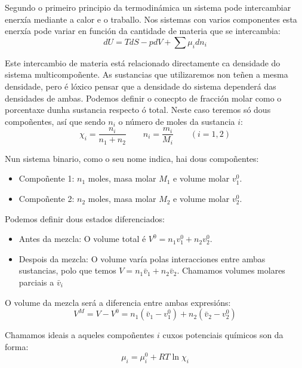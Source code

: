 \documentclass[12pt, a4paper, titlepage]{article}
\begin{document}
  Segundo o primeiro principio da termodinámica un sistema pode intercambiar enerxía mediante a calor e o traballo. Nos sistemas con varios componentes esta enerxía pode variar en función da cantidade de materia que se intercambia:
  \begin{equation}
    dU = TdS - pdV + \sum \mu_i dn_i
    \label{ec:primeiro_principio}
  \end{equation}

  Este intercambio de materia está relacionado directamente ca densidade do sistema multicompoñente. As sustancias que utilizaremos non teñen a mesma densidade, pero é lóxico pensar que a densidade do sistema dependerá das densidades de ambas. Podemos definir o conecpto de fracción molar como o porcentaxe dunha sustancia respecto ó total. Neste caso teremos só dous compoñentes, así que sendo $n_i$ o número de moles da sustancia $i$:
  \begin{equation}
    \chi_i = \frac{n_i}{n_1 + n_2} \qquad n_i = \frac{m_i}{M_i} \qquad (i = 1, 2)
    \label{ec:fraccion_molar}
  \end{equation}

  Nun sistema binario, como o seu nome indica, hai dous compoñentes:
  \begin{itemize}
    \setlength\itemsep{-4pt}
    \item Compoñente 1: $n_1$ moles, masa molar $M_1$ e volume molar $v_1^0$.
    \item Compoñente 2: $n_2$ moles, masa molar $M_2$ e volume molar $v_2^0$.
  \end{itemize}

  Podemos definir dous estados diferenciados:
  \begin{itemize}
    \setlength\itemsep{-4pt}
    \item Antes da mezcla: O volume total é $V^0 = n_1 v_1^0 + n_2 v_2^0$.
    \item Despois da mezcla: O volume varía polas interacciones entre ambas sustancias, polo que temos $V = n_1 \bar{v}_1 + n_2 \bar{v}_2$. Chamamos volumes molares parciais a $\bar{v}_i$
  \end{itemize}

  O volume da mezcla será a diferencia entre ambas expresións:
  \begin{equation}
    V^M = V - V^0 = n_1 (\bar{v}_1 - v_1^0) + n_2 (\bar{v}_2 - v_2^0)
    \label{ec:volume_mezcla}
  \end{equation}

  Chamamos ideais a aqueles compoñentes $i$ cuxos potenciais químicos son da forma:
  \begin{equation}
    \mu_i = \mu_i^0 + RT \ln \chi_i
    \label{ec:potencial_quimico_ideal}
  \end{equation}
\end{document}
